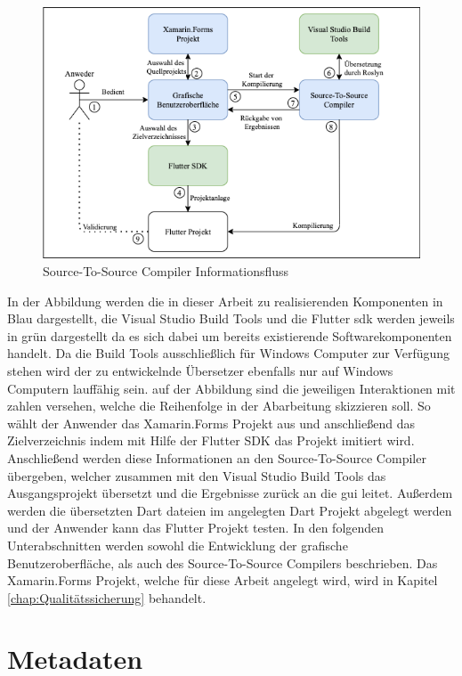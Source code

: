 \begin{figure}[!ht]
 \includegraphics[width=\textwidth,keepaspectratio]{Images/Implementation/IDE.png}
 \caption{Source-To-Source Compiler Informationsfluss}
 \label{fig:IDE}
\end{figure}
In der Abbildung werden die in dieser Arbeit zu realisierenden Komponenten in Blau dargestellt,  die Visual Studio Build Tools und die Flutter \ac{sdk} werden jeweils in grün dargestellt da es sich dabei um bereits existierende Softwarekomponenten handelt.  Da die Build Tools ausschließlich für Windows Computer zur Verfügung stehen wird der zu entwickelnde Übersetzer ebenfalls nur auf Windows Computern lauffähig sein.  auf der Abbildung sind die jeweiligen Interaktionen mit zahlen versehen,  welche die Reihenfolge in der Abarbeitung skizzieren soll.  So wählt der Anwender das Xamarin.Forms Projekt aus und anschließend das Zielverzeichnis indem mit Hilfe der Flutter SDK das Projekt imitiert wird.  Anschließend werden diese Informationen an den Source-To-Source Compiler übergeben, welcher zusammen mit den Visual Studio Build Tools das Ausgangsprojekt übersetzt und die Ergebnisse zurück an die \ac{gui} leitet.  Außerdem werden die übersetzten Dart dateien im angelegten Dart Projekt abgelegt werden und der Anwender kann das Flutter Projekt testen.  
In den folgenden Unterabschnitten werden sowohl die Entwicklung der grafische Benutzeroberfläche, als auch des Source-To-Source Compilers beschrieben.  Das Xamarin.Forms Projekt, welche für diese Arbeit angelegt wird, wird in Kapitel \ref{chap:Qualitätssicherung} behandelt. 



\section{Metadaten}


